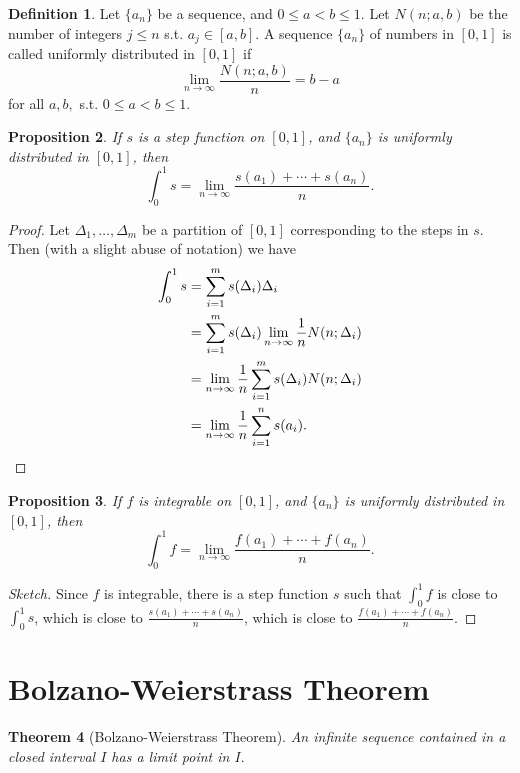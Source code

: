 \documentclass[12pt]{article}
\theoremstyle{plain}
\newtheorem{theorem}{Theorem}
\newtheorem{proposition}[theorem]{Proposition}
\theoremstyle{definition}
\newtheorem{definition}[theorem]{Definition}
\theoremstyle{remark}
\begin{document}
\begin{definition}
Let $\{a_n\}$ be a sequence, and $0 \leq a < b \leq 1$. Let $N(n; a, b)$ be the number of integers $j \leq n$ s.t. $a_j \in [a, b].$ A sequence $\{a_n\}$ of numbers in $[0, 1]$ is called uniformly distributed in $[0, 1]$ if $$\lim_{n \to \infty} \frac{N(n; a, b)}{n} = b - a$$ for all $a, b,$ s.t. $0 \leq a < b \leq 1.$
\end{definition}

\begin{proposition}
If $s$ is a step function on $[0, 1]$, and $\{a_n\}$ is uniformly distributed in $[0, 1]$, then $$\int_0^1 s = \lim_{n\to\infty} \frac{s(a_1) + \cdots + s(a_n)}{n}.$$
\end{proposition}

\begin{proof}
Let $\Delta_1, \ldots, \Delta_m$ be a partition of $[0, 1]$ corresponding to the steps in $s.$ Then (with a slight abuse of notation) we have
\begin{align*}
\int_0^1 s &= \sum_{i=1}^m s(\Delta_i) \Delta_i \\
&= \sum_{i=1}^m s(\Delta_i) \lim_{n \to \infty} \frac{1}{n} N(n; \Delta_i) \\
&= \lim_{n \to \infty} \frac{1}{n} \sum_{i=1}^m s(\Delta_i) N(n; \Delta_i) \\
&= \lim_{n \to \infty} \frac{1}{n} \sum_{i=1}^n s(a_i).\qedhere
\end{align*}
\end{proof}

\begin{proposition}
If $f$ is integrable on $[0, 1]$, and $\{a_n\}$ is uniformly distributed in $[0, 1]$, then $$\int_0^1 f = \lim_{n\to\infty} \frac{f(a_1) + \cdots + f(a_n)}{n}.$$
\end{proposition}

\begin{proof}[Sketch]
Since $f$ is integrable, there is a step function $s$ such that $\int_0^1 f$ is close to $\int_0^1 s$, which is close to $\frac{s(a_1) + \cdots + s(a_n)}{n}$, which is close to $\frac{f(a_1) + \cdots + f(a_n)}{n}$.
\end{proof}

\section{Bolzano-Weierstrass Theorem}

\begin{theorem}[Bolzano-Weierstrass Theorem]
An infinite sequence contained in a closed interval $I$ has a limit point in $I.$
\end{theorem}
\end{document}
